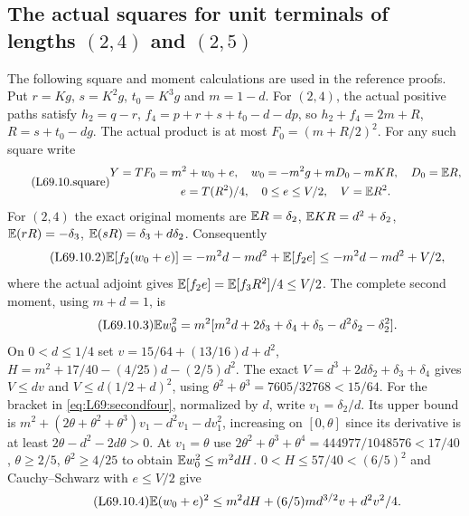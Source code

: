 \subsection{The actual squares for unit terminals of lengths $(2,4)$ and $(2,5)$}\label{proof:Q5-C069}
The following square and moment calculations are used in the reference proofs. Put $r=Kg$, $s=K^2g$, $t_0=K^3g$ and $m=1-d$.
For $(2,4)$, the actual positive paths satisfy
$h_2=q-r$, $f_4=p+r+s+t_0-d-dp$, so
$h_2+f_4=2m+R$, $R=s+t_0-dg$.
The actual product is at most $F_0=(m+R/2)^2$.
For any such square write
\begin{equation}\tag{L69.10.square}\label{eq:L69:square}
\begin{gathered}
Y=TF_0=m^2+w_0+e,\quad w_0=-m^2g+mD_0-mKR,\quad D_0=\mathbb E R,\\
e=T(R^2)/4,\quad0\le e\le V/2,\quad V=\mathbb E R^2.
\end{gathered}
\end{equation}
For $(2,4)$ the exact original moments are
$\mathbb E R=\delta_2$, $\mathbb E KR=d^2+\delta_2$,
$\mathbb E(rR)=-\delta_3$, $\mathbb E(sR)=\delta_3+d\delta_2$.
Consequently
\begin{equation}\tag{L69.10.2}\label{eq:L69:firstfour}
\mathbb E[f_2(w_0+e)]=-m^2d-md^2+\mathbb E[f_2e]
\le-m^2d-md^2+V/2,
\end{equation}
where the actual adjoint gives
$\mathbb E[f_2e]=\mathbb E[f_3R^2]/4\le V/2$.
The complete second moment, using $m+d=1$, is
\begin{equation}\tag{L69.10.3}\label{eq:L69:secondfour}
\mathbb E w_0^2=m^2[m^2d+2\delta_3+\delta_4+\delta_5
-d^2\delta_2-\delta_2^2].
\end{equation}
On $0<d\le1/4$ set
$v=15/64+(13/16)d+d^2$,
$H=m^2+17/40-(4/25)d-(2/5)d^2$.
The exact $V=d^3+2d\delta_2+\delta_3+\delta_4$ gives
$V\le dv$ and $V\le d(1/2+d)^2$,
using $\theta^2+\theta^3=7605/32768<15/64$.
For the bracket in \eqref{eq:L69:secondfour}, normalized by $d$,
write $v_1=\delta_2/d$. Its upper bound is
$m^2+(2\theta+\theta^2+\theta^3)v_1-d^2v_1-dv_1^2$,
increasing on $[0,\theta]$ since its derivative is at least
$2\theta-d^2-2d\theta>0$.
At $v_1=\theta$ use
$2\theta^2+\theta^3+\theta^4=444977/1048576<17/40$,
$\theta\ge2/5$, $\theta^2\ge4/25$ to obtain
$\mathbb E w_0^2\le m^2dH$.
$0<H\le57/40<(6/5)^2$ and Cauchy--Schwarz with $e\le V/2$ give
\begin{equation}\tag{L69.10.4}\label{eq:L69:fourvariance}
\mathbb E(w_0+e)^2\le m^2dH+(6/5)md^{3/2}v+d^2v^2/4.
\end{equation}

